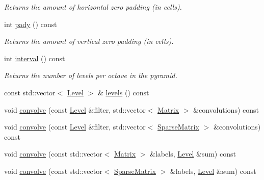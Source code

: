 \begin{DoxyCompactItemize}
\begin{DoxyCompactList}\small\item\em Returns the amount of horizontal zero padding (in cells). \end{DoxyCompactList}\item 
\hypertarget{class_f_f_l_d_1_1_h_o_g_pyramid_a4f29cae69e366eb3b5c36b0bdde6962f}{int \hyperlink{class_f_f_l_d_1_1_h_o_g_pyramid_a4f29cae69e366eb3b5c36b0bdde6962f}{pady} () const }\label{class_f_f_l_d_1_1_h_o_g_pyramid_a4f29cae69e366eb3b5c36b0bdde6962f}

\begin{DoxyCompactList}\small\item\em Returns the amount of vertical zero padding (in cells). \end{DoxyCompactList}\item 
\hypertarget{class_f_f_l_d_1_1_h_o_g_pyramid_a86c9ee51bac62aa0bd7fe8b29ad32cab}{int \hyperlink{class_f_f_l_d_1_1_h_o_g_pyramid_a86c9ee51bac62aa0bd7fe8b29ad32cab}{interval} () const }\label{class_f_f_l_d_1_1_h_o_g_pyramid_a86c9ee51bac62aa0bd7fe8b29ad32cab}

\begin{DoxyCompactList}\small\item\em Returns the number of levels per octave in the pyramid. \end{DoxyCompactList}\item 
const std\-::vector$<$ \hyperlink{class_f_f_l_d_1_1_h_o_g_pyramid_a1cd36670adf29538f44dfa434695ec34}{Level} $>$ \& \hyperlink{class_f_f_l_d_1_1_h_o_g_pyramid_ad43fe5cba5e0f23c0741a15b43da9079}{levels} () const 
\item 
void \hyperlink{class_f_f_l_d_1_1_h_o_g_pyramid_a90bcd58cf1dd4a47d128d2135b077c8c}{convolve} (const \hyperlink{class_f_f_l_d_1_1_h_o_g_pyramid_a1cd36670adf29538f44dfa434695ec34}{Level} \&filter, std\-::vector$<$ \hyperlink{class_f_f_l_d_1_1_h_o_g_pyramid_a2618b4bd5d17f05cdc108189ed5abe3a}{Matrix} $>$ \&convolutions) const 
\item 
void \hyperlink{class_f_f_l_d_1_1_h_o_g_pyramid_a55ebcb020dfece07f3e806ccbb4ad3c9}{convolve} (const \hyperlink{class_f_f_l_d_1_1_h_o_g_pyramid_a1cd36670adf29538f44dfa434695ec34}{Level} \&filter, std\-::vector$<$ \hyperlink{class_f_f_l_d_1_1_h_o_g_pyramid_a7f1784cd0a524bd5a2ecdd6e0dc98c35}{Sparse\-Matrix} $>$ \&convolutions) const 
\item 
void \hyperlink{class_f_f_l_d_1_1_h_o_g_pyramid_a0a90c310f6e1ccdb2c02374caa0f8de7}{convolve} (const std\-::vector$<$ \hyperlink{class_f_f_l_d_1_1_h_o_g_pyramid_a2618b4bd5d17f05cdc108189ed5abe3a}{Matrix} $>$ \&labels, \hyperlink{class_f_f_l_d_1_1_h_o_g_pyramid_a1cd36670adf29538f44dfa434695ec34}{Level} \&sum) const 
\item 
void \hyperlink{class_f_f_l_d_1_1_h_o_g_pyramid_a63793871ef3cd2a25312159561ede09c}{convolve} (const std\-::vector$<$ \hyperlink{class_f_f_l_d_1_1_h_o_g_pyramid_a7f1784cd0a524bd5a2ecdd6e0dc98c35}{Sparse\-Matrix} $>$ \&labels, \hyperlink{class_f_f_l_d_1_1_h_o_g_pyramid_a1cd36670adf29538f44dfa434695ec34}{Level} \&sum) const 
\end{DoxyCompactItemize}
